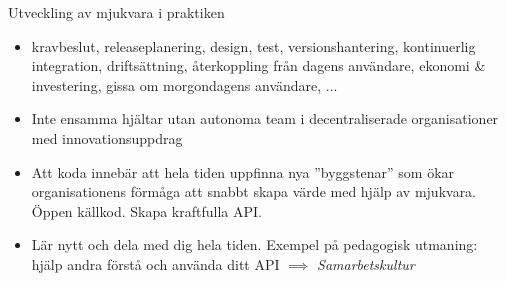 \documentclass{lecturenotes}
\begin{document}

\begin{Slide}{Utveckling av mjukvara i praktiken}
\begin{itemize}
\item {} kravbeslut, releaseplanering, design, test, versionshantering, kontinuerlig integration, driftsättning, återkoppling från dagens användare, ekonomi \& investering, gissa om morgondagens användare, ... 
\item {} Inte ensamma hjältar utan autonoma team i decentraliserade organisationer med innovationsuppdrag
\item {} Att koda innebär att hela tiden uppfinna nya ''byggstenar'' som ökar organisationens förmåga att snabbt skapa värde med hjälp av mjukvara. Öppen källkod. Skapa kraftfulla API. 
\item {} Lär nytt och dela med dig hela tiden. Exempel på pedagogisk utmaning: hjälp andra förstå och använda ditt API $\implies$ \textit{Samarbetskultur}
\end{itemize}
\end{Slide}
\end{document}
